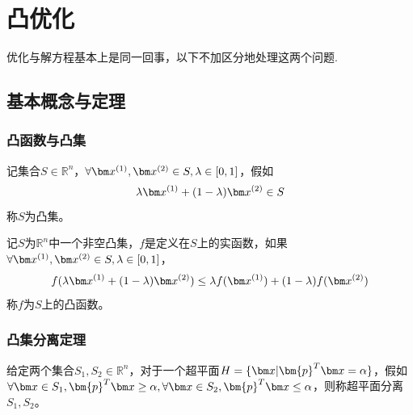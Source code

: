 \chapter{凸优化}\label{convex-optimization}
优化与解方程基本上是同一回事，以下不加区分地处理这两个问题.

\section{基本概念与定理}
\subsection{凸函数与凸集}
\begin{definition}[凸集]{}
记集合$S\in \mathbb{R}^n$，$\forall \bx^{(1)},\bx^{(2)}\in S,\lambda\in[0,1]$，假如
$$\lambda  \bx^{(1)}+(1-\lambda) \bx^{(2)}\in S$$
称$S$为凸集。
\end{definition}
\begin{definition}[凸函数]{}
记$S$为$\mathbb{R}^n$中一个非空凸集，$f$是定义在$S$上的实函数，如果$\forall \bx^{(1)},\bx^{(2)}\in S,\lambda\in[0,1]$，
$$f(\lambda \bx^{(1)}+(1-\lambda)\bx^{(2)})\leq \lambda f(\bx^{(1)})+(1-\lambda)f(\bx^{(2)})$$
称$f$为$S$上的凸函数。
\end{definition}

\subsection{凸集分离定理}
给定两个集合$S_1,S_2\in \mathbb{R}^n$，对于一个超平面$H=\{\bx|\bm{p}^T\bx=\alpha\}$，假如$\forall \bx\in S_1,\bm{p}^T\bx\geq\alpha,\forall \bx\in S_2,\bm{p}^T\bx\leq\alpha$，则称超平面分离$S_1,S_2$。


